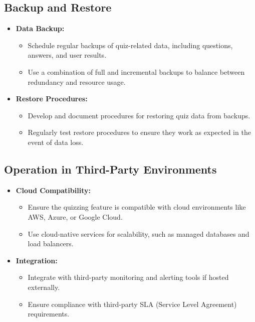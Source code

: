 \subsection{Backup and Restore}

\begin{itemize}
    \item \textbf{Data Backup:}
          \begin{itemize}
              \item Schedule regular backups of quiz-related data, including questions, answers, and user results.
              \item Use a combination of full and incremental backups to balance between redundancy and resource usage.
          \end{itemize}
    \item \textbf{Restore Procedures:}
          \begin{itemize}
              \item Develop and document procedures for restoring quiz data from backups.
              \item Regularly test restore procedures to ensure they work as expected in the event of data loss.
          \end{itemize}
\end{itemize}


\subsection{Operation in Third-Party Environments}

\begin{itemize}
    \item \textbf{Cloud Compatibility:}
          \begin{itemize}
              \item Ensure the quizzing feature is compatible with cloud environments like AWS, Azure, or Google Cloud.
              \item Use cloud-native services for scalability, such as managed databases and load balancers.
          \end{itemize}
    \item \textbf{Integration:}
          \begin{itemize}
              \item Integrate with third-party monitoring and alerting tools if hosted externally.
              \item Ensure compliance with third-party SLA (Service Level Agreement) requirements.
          \end{itemize}
\end{itemize}


